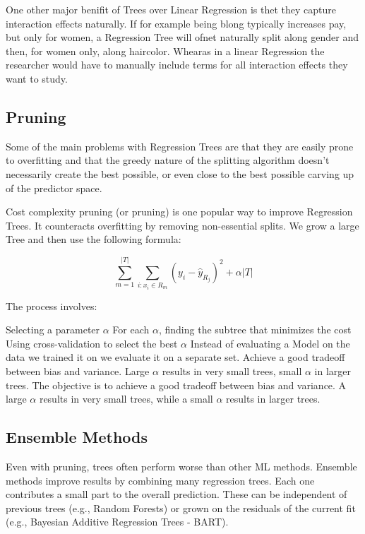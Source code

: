 \documentclass[12pt]{article}
\begin{document}
One other major benifit of Trees over Linear Regression is thet they capture interaction effects naturally. If for example being blong typically increases pay, but only for women, a Regression Tree will ofnet naturally split along gender and then, for women only, along haircolor. Whearas in a linear Regression the researcher would have to manually include terms for all interaction effects they want to study.

\subsection{Pruning}

Some of the main problems with Regression Trees are that they are easily prone to overfitting and that the greedy nature of the splitting algorithm doesn't necessarily create the best possible, or even close to the best possible carving up of the predictor space.




Cost complexity pruning (or pruning) is one popular way to improve Regression Trees. It counteracts overfitting by removing non-essential splits. We grow a large Tree and then use the following formula:

\begin{equation}
    \sum_{m=1}^{|T|} \sum_{i: x_i \in R_m} (y_i - \hat{y}_{R_j})^2 + \alpha|T|
\end{equation}

The process involves:

Selecting a parameter $\alpha$
For each $\alpha$, finding the subtree that minimizes the cost
Using cross-validation to select the best $\alpha$
Instead of evaluating a Model on the data we trained it on we evaluate it on a separate set.
Achieve a good tradeoff between bias and variance.
Large \( \alpha \) results in very small trees, small \( \alpha \) in larger trees.
The objective is to achieve a good tradeoff between bias and variance. A large $\alpha$ results in very small trees, while a small $\alpha$ results in larger trees.


\subsection{Ensemble Methods}
Even with pruning, trees often perform worse than other ML methods. Ensemble methods improve results by combining many regression trees. Each one contributes a small part to the overall prediction. These can be independent of previous trees (e.g., Random Forests) or grown on the residuals of the current fit (e.g., Bayesian Additive Regression Trees - BART).
\end{document}
